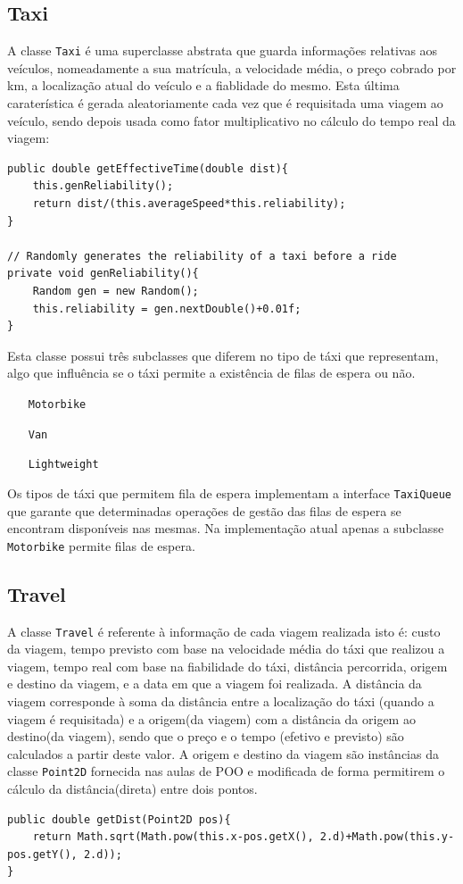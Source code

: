 \documentclass[a4paper,10pt,portuguese]{article}
\begin{document}
\subsection{Taxi}
\label{Taxi}
A classe \texttt{Taxi} é uma superclasse abstrata que guarda informações relativas aos veículos, nomeadamente a sua matrícula, a velocidade média, o preço cobrado por km, a localização atual do veículo e a fiablidade do mesmo. Esta última caraterística é gerada aleatoriamente cada vez que é requisitada uma viagem ao veículo, sendo depois usada como fator multiplicativo no cálculo do tempo real da viagem:
\begin{verbatim}
public double getEffectiveTime(double dist){
    this.genReliability();
    return dist/(this.averageSpeed*this.reliability);
}
    
// Randomly generates the reliability of a taxi before a ride
private void genReliability(){
    Random gen = new Random();
    this.reliability = gen.nextDouble()+0.01f;
}
\end{verbatim}
Esta classe possui três subclasses que diferem no tipo de táxi que representam, algo que influência se o táxi permite a existência de filas de espera ou não.
\begin{itemize}
	\item[\texttt{Motorbike\label{Motorbike}}]
	\item[\texttt{Van}]
	\item[\texttt{Lightweight}]
\end{itemize}
Os tipos de táxi que permitem fila de espera implementam a interface \texttt{TaxiQueue} que garante que determinadas operações de gestão das filas de espera se encontram disponíveis nas mesmas. Na implementação atual apenas a subclasse \texttt{Motorbike} permite filas de espera.

\subsection{Travel}
A classe \texttt{Travel} é referente à informação de cada viagem realizada isto é: custo da viagem, tempo previsto com base na velocidade média do táxi que realizou a viagem, tempo real com base na fiabilidade do táxi, distância percorrida, origem e destino da viagem, e a data em que a viagem foi realizada. A distância da viagem corresponde à soma da distância entre a localização do táxi (quando a viagem é requisitada) e a origem(da viagem) com a distância da origem ao destino(da viagem), sendo que o preço e o tempo (efetivo e previsto) são calculados a partir deste valor. A origem e destino da viagem são instâncias da classe \texttt{Point2D} fornecida nas aulas de POO e modificada de forma permitirem o cálculo da distância(direta) entre dois pontos.
\begin{verbatim}
public double getDist(Point2D pos){
    return Math.sqrt(Math.pow(this.x-pos.getX(), 2.d)+Math.pow(this.y-pos.getY(), 2.d));
}
\end{verbatim}
\end{document}
